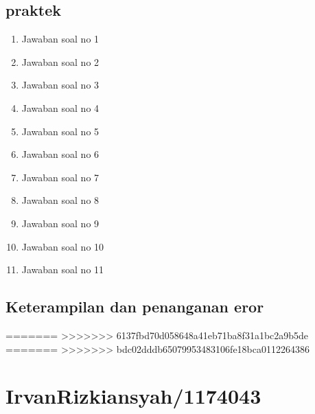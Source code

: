 \subsection{praktek}
\begin{enumerate}
    \item Jawaban soal no 1
    
    \item Jawaban soal no 2
    
    \item Jawaban soal no 3
    
    \item Jawaban soal no 4
    
    \item Jawaban soal no 5
    
    \item Jawaban soal no 6
    
    \item Jawaban soal no 7
    
    \item Jawaban soal no 8
    
    \item Jawaban soal no 9
    
    \item Jawaban soal no 10
    
    \item Jawaban soal no 11
    
\end{enumerate}

\subsection{Keterampilan dan penanganan eror}
    


=======
>>>>>>> 6137fbd70d058648a41eb71ba8f31a1bc2a9b5de
=======
>>>>>>> bdc02dddb65079953483106fe18bca0112264386
\section{IrvanRizkiansyah/1174043}
